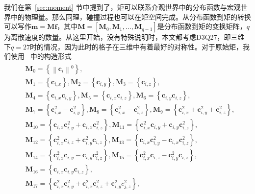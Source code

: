 我们在第~\ref{sec:moment} 节中提到了，矩可以联系介观世界中的分布函数与宏观世界中的物理量。那么同理，碰撞过程也可以在矩空间完成。从分布函数到矩的转换可以写作$\mathbf{m}=\mathbf{M}\mathbf{f}$，其中$\mathbf{M}=[\mathbf{M}_0, \mathbf{M}_1, \dots, \mathbf{M}_{q-1}]$是分布函数到矩的变换矩阵，$q$为离散速度的数量。从这里开始，没有特殊说明时，本文都考虑D3Q27，即三维下$q=27$时的情况，因为此时的格子在三维中有着最好的对称性。对于原始矩，我们使用~\citep{PhysRevE.95.013310} 中的构造形式
\begin{align}
\begin{split}
    & \boldsymbol{M}_0=\left\{\left\|\boldsymbol{c}_i\right\|^0\right\}, \\
    & \boldsymbol{M}_1=\left\{\boldsymbol{c}_{i, x}\right\}, \boldsymbol{M}_2=\left\{\boldsymbol{c}_{i, y}\right\}, \boldsymbol{M}_3=\left\{\boldsymbol{c}_{i, z}\right\}, \\
    & \boldsymbol{M}_4=\left\{\boldsymbol{c}_{i, x} \boldsymbol{c}_{i, y}\right\}, \boldsymbol{M}_5=\left\{\boldsymbol{c}_{i, x} \boldsymbol{c}_{i, z}\right\}, \boldsymbol{M}_6=\left\{\boldsymbol{c}_{i, y} \boldsymbol{c}_{i, z}\right\}, \\
    & \boldsymbol{M}_7=\left\{\boldsymbol{c}_{i, x}^2-\boldsymbol{c}_{i, y}^2\right\}, \boldsymbol{M}_8=\left\{\boldsymbol{c}_{i, x}^2-\boldsymbol{c}_{i, z}^2\right\}, \boldsymbol{M}_9=\left\{\boldsymbol{c}_{i, x}^2+\boldsymbol{c}_{i, y}^2+\boldsymbol{c}_{i, z}^2\right\}, \\
    & \boldsymbol{M}_{10}=\left\{\boldsymbol{c}_{i, x} \boldsymbol{c}_{i, y}^2+\boldsymbol{c}_{i, x} \boldsymbol{c}_{i, z}^2\right\}, \boldsymbol{M}_{11}=\left\{\boldsymbol{c}_{i, x}^2 \boldsymbol{c}_{i, y}+\boldsymbol{c}_{i, y} \boldsymbol{c}_{i, z}^2\right\}, \\
    & \boldsymbol{M}_{12}=\left\{\boldsymbol{c}_{i, x}^2 \boldsymbol{c}_{i, z}+\boldsymbol{c}_{i, y}^2 \boldsymbol{c}_{i, z}\right\}, \boldsymbol{M}_{13}=\left\{\boldsymbol{c}_{i, x} \boldsymbol{c}_{i, y}^2-\boldsymbol{c}_{i, x} \boldsymbol{c}_{i, z}^2\right\}, \\
    & \boldsymbol{M}_{14}=\left\{\boldsymbol{c}_{i, x}^2 \boldsymbol{c}_{i, y}-\boldsymbol{c}_{i, y} \boldsymbol{c}_{i, z}^2\right\}, \boldsymbol{M}_{15}=\left\{\boldsymbol{c}_{i, x}^2 \boldsymbol{c}_{i, z}-\boldsymbol{c}_{i, y}^2 \boldsymbol{c}_{i, z}\right\}, \\
    & \boldsymbol{M}_{16}=\left\{\boldsymbol{c}_{i, x} \boldsymbol{c}_{i, y} \boldsymbol{c}_{i, z}\right\}, \\
    & \boldsymbol{M}_{17}=\left\{\boldsymbol{c}_{i, x}^2 \boldsymbol{c}_{i, y}^2+\boldsymbol{c}_{i, x}^2 \boldsymbol{c}_{i, z}^2+\boldsymbol{c}_{i, y}^2 c_{j, z}^2\right\}, \\

\end{split}
\end{align}
